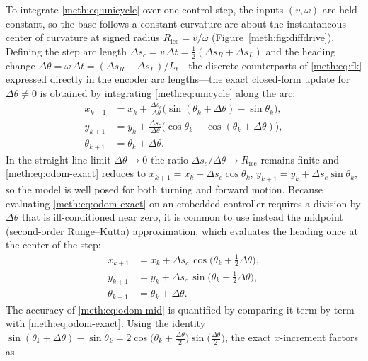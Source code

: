 To integrate \eqref{meth:eq:unicycle} over one control step, the inputs $(v,\omega)$ are held constant, so the base follows a constant-curvature arc about the instantaneous center of curvature at signed radius $R_{\mathrm{icc}}=v/\omega$ (Figure~\ref{meth:fig:diffdrive}). Defining the step arc length $\Delta s_c = v\,\Delta t = \tfrac{1}{2}(\Delta s_R+\Delta s_L)$ and the heading change $\Delta\theta = \omega\,\Delta t = (\Delta s_R-\Delta s_L)/L_t$---the discrete counterparts of \eqref{meth:eq:fk} expressed directly in the encoder arc lengths---the exact closed-form update for $\Delta\theta\neq 0$ is obtained by integrating \eqref{meth:eq:unicycle} along the arc:
\begin{equation}
\begin{aligned}
x_{k+1} &= x_k + \frac{\Delta s_c}{\Delta\theta}\big(\sin(\theta_k+\Delta\theta) - \sin\theta_k\big),\\[2pt]
y_{k+1} &= y_k + \frac{\Delta s_c}{\Delta\theta}\big(\cos\theta_k - \cos(\theta_k+\Delta\theta)\big),\\[2pt]
\theta_{k+1} &= \theta_k + \Delta\theta .
\end{aligned}
\label{meth:eq:odom-exact}
\end{equation}
In the straight-line limit $\Delta\theta\!\to\!0$ the ratio $\Delta s_c/\Delta\theta\!\to\!R_{\mathrm{icc}}$ remains finite and \eqref{meth:eq:odom-exact} reduces to $x_{k+1}=x_k+\Delta s_c\cos\theta_k$, $y_{k+1}=y_k+\Delta s_c\sin\theta_k$, so the model is well posed for both turning and forward motion. Because evaluating \eqref{meth:eq:odom-exact} on an embedded controller requires a division by $\Delta\theta$ that is ill-conditioned near zero, it is common to use instead the midpoint (second-order Runge--Kutta) approximation, which evaluates the heading once at the center of the step:
\begin{equation}
\begin{aligned}
x_{k+1} &= x_k + \Delta s_c\,\cos\!\big(\theta_k + \tfrac{1}{2}\Delta\theta\big),\\[2pt]
y_{k+1} &= y_k + \Delta s_c\,\sin\!\big(\theta_k + \tfrac{1}{2}\Delta\theta\big),\\[2pt]
\theta_{k+1} &= \theta_k + \Delta\theta .
\end{aligned}
\label{meth:eq:odom-mid}
\end{equation}
The accuracy of \eqref{meth:eq:odom-mid} is quantified by comparing it term-by-term with \eqref{meth:eq:odom-exact}. Using the identity $\sin(\theta_k+\Delta\theta)-\sin\theta_k = 2\cos\!\big(\theta_k+\tfrac{\Delta\theta}{2}\big)\sin\!\big(\tfrac{\Delta\theta}{2}\big)$, the exact $x$-increment factors as
